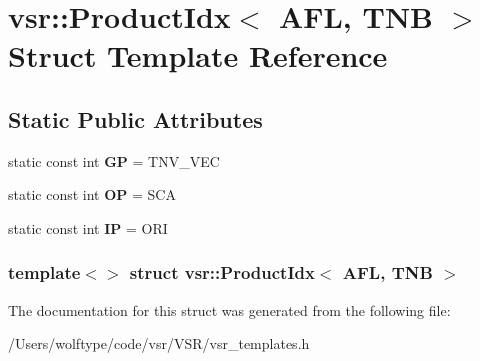 \hypertarget{structvsr_1_1_product_idx_3_01_a_f_l_00_01_t_n_b_01_4}{\section{vsr\-:\-:Product\-Idx$<$ A\-F\-L, T\-N\-B $>$ Struct Template Reference}
\label{structvsr_1_1_product_idx_3_01_a_f_l_00_01_t_n_b_01_4}
}
\subsection*{Static Public Attributes}
\begin{DoxyCompactItemize}
\item 
\hypertarget{structvsr_1_1_product_idx_3_01_a_f_l_00_01_t_n_b_01_4_ae38b0eb94930498b0dd04fd27d3b5019}{static const int {\bfseries G\-P} = T\-N\-V\-\_\-\-V\-E\-C}\label{structvsr_1_1_product_idx_3_01_a_f_l_00_01_t_n_b_01_4_ae38b0eb94930498b0dd04fd27d3b5019}

\item 
\hypertarget{structvsr_1_1_product_idx_3_01_a_f_l_00_01_t_n_b_01_4_a5c7dc3db6100681a0173f0133e7681fc}{static const int {\bfseries O\-P} = S\-C\-A}\label{structvsr_1_1_product_idx_3_01_a_f_l_00_01_t_n_b_01_4_a5c7dc3db6100681a0173f0133e7681fc}

\item 
\hypertarget{structvsr_1_1_product_idx_3_01_a_f_l_00_01_t_n_b_01_4_a97ab4a6d1bfb88d59b9b619b6c7c27ef}{static const int {\bfseries I\-P} = O\-R\-I}\label{structvsr_1_1_product_idx_3_01_a_f_l_00_01_t_n_b_01_4_a97ab4a6d1bfb88d59b9b619b6c7c27ef}

\end{DoxyCompactItemize}
\subsubsection*{template$<$$>$ struct vsr\-::\-Product\-Idx$<$ A\-F\-L, T\-N\-B $>$}



The documentation for this struct was generated from the following file\-:\begin{DoxyCompactItemize}
\item 
/\-Users/wolftype/code/vsr/\-V\-S\-R/vsr\-\_\-templates.\-h\end{DoxyCompactItemize}
